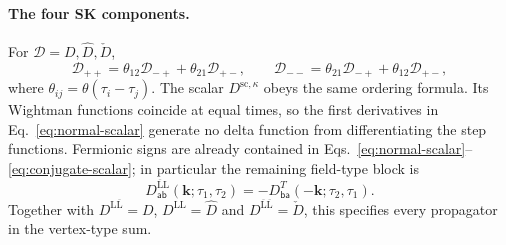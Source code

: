 \documentclass[a4paper,12pt]{article}
\newcommand{\mb}{\mathbf}
\def\aa{\mathsf a}
\newcommand{\bb}{\mathsf b}
\newcommand{\bk}{\mb k}
\newcommand{\Dsc}[1]{D^{\mathrm{sc},#1}}
\begin{document}
\paragraph{The four SK components.}
For $\mathcal D=D,\widehat D,\check D$,
\begin{equation}
 \mathcal D_{++}=\theta_{12}\mathcal D_{-+}
                 +\theta_{21}\mathcal D_{+-},\qquad
 \mathcal D_{--}=\theta_{21}\mathcal D_{-+}
                 +\theta_{12}\mathcal D_{+-},
 \label{eq:three-propagator-sk}
\end{equation}
where $\theta_{ij}=\theta(\tau_i-\tau_j)$.
The scalar $\Dsc{\kappa}$ obeys the same ordering formula.
Its Wightman functions coincide at equal times, so the first
derivatives in Eq.~\eqref{eq:normal-scalar} generate no delta function
from differentiating the step functions.
Fermionic signs are already contained in
Eqs.~\eqref{eq:normal-scalar}--\eqref{eq:conjugate-scalar};
in particular the remaining field-type block is
\begin{equation}
 D^{\overline{\mathrm L}\mathrm L}_{\aa\bb}(\bk;\tau_1,\tau_2)
 =-D_{\bb\aa}^{T}(-\bk;\tau_2,\tau_1).
 \label{eq:anomalous-reversal}
\end{equation}
Together with $D^{\mathrm L\overline{\mathrm L}}=D$,
$D^{\mathrm L\mathrm L}=\widehat D$ and
$D^{\overline{\mathrm L}\overline{\mathrm L}}=\check D$,
this specifies every propagator in the vertex-type sum.
\end{document}

